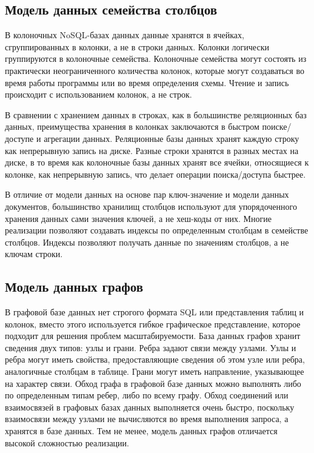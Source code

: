 \subsection{Модель данных семейства столбцов}

В колоночных NoSQL-базах данных данные хранятся в ячейках, сгруппированных в колонки, а не в строки данных. Колонки логически группируются в колоночные семейства. Колоночные семейства могут состоять из практически неограниченного количества колонок, которые могут создаваться во время работы программы или во время определения схемы. Чтение и запись происходит с использованием колонок, а не строк.

В сравнении с хранением данных в строках, как в большинстве реляционных баз данных, преимущества хранения в колонках заключаются в быстром поиске/доступе и агрегации данных. Реляционные базы данных хранят каждую строку как непрерывную запись на диске. Разные строки хранятся в разных местах на диске, в то время как колоночные базы данных хранят все ячейки, относящиеся к колонке, как непрерывную запись, что делает операции поиска/доступа быстрее.

В отличие от модели данных на основе пар ключ-значение и модели данных документов, большинство хранилищ столбцов используют для упорядоченного хранения данных сами значения ключей, а не хеш-коды от них. Многие реализации позволяют создавать индексы по определенным столбцам в семействе столбцов. Индексы позволяют получать данные по значениям столбцов, а не ключам строки. 

\subsection{Модель данных графов}

В графовой базе данных нет строгого формата SQL или представления таблиц и колонок, вместо этого используется гибкое графическое представление, которое подходит для решения проблем масштабируемости. База данных графов хранит сведения двух типов: узлы и грани. Ребра задают связи между узлами. Узлы и ребра могут иметь свойства, предоставляющие сведения об этом узле или ребра, аналогичные столбцам в таблице. Грани могут иметь направление, указывающее на характер связи. Обход графа в графовой базе данных можно выполнять либо по определенным типам ребер, либо по всему графу. Обход соединений или взаимосвязей в графовых базах данных выполняется очень быстро, поскольку взаимосвязи между узлами не вычисляются во время выполнения запроса, а хранятся в базе данных. Тем не менее, модель данных графов отличается высокой сложностью реализации.

